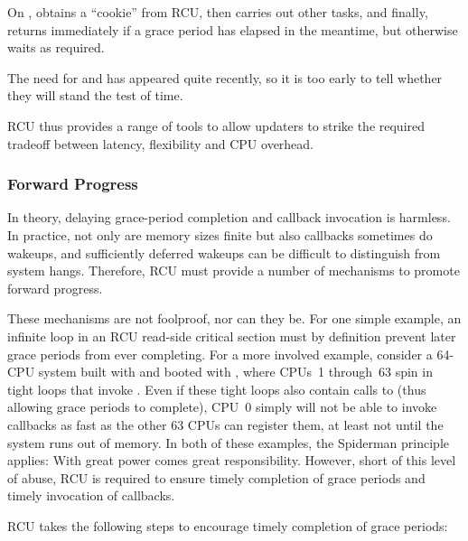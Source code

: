 \begin{fcvref}
On , %
 obtains a ``cookie'' from RCU,
then  %
carries out other tasks, and finally,  %
returns
immediately if a grace period has elapsed in the meantime, but otherwise
waits as required.
\end{fcvref}
The need for  and
 has appeared quite recently, so it is too
early to tell whether they will stand the test of time.

RCU thus provides a range of tools to allow updaters to strike the
required tradeoff between latency, flexibility and CPU overhead.


\subsubsection{Forward Progress}

In theory, delaying grace-period completion and callback invocation is
harmless.
In practice, not only are memory sizes finite but also
callbacks sometimes do wakeups, and sufficiently deferred wakeups can be
difficult to distinguish from system hangs.
Therefore, RCU must provide
a number of mechanisms to promote forward progress.

These mechanisms are not foolproof, nor can they be. For one simple
example, an infinite loop in an RCU read-side critical section must by
definition prevent later grace periods from ever completing.
For a more
involved example, consider a 64-CPU system built with
 and booted with , where
CPUs~1 through~63 spin in tight loops that invoke .
Even
if these tight loops also contain calls to  (thus
allowing grace periods to complete), CPU~0 simply will not be able to
invoke callbacks as fast as the other 63 CPUs can register them, at
least not until the system runs out of memory.
In both of these
examples, the Spiderman principle applies:
With great power comes great
responsibility.
However, short of this level of abuse, RCU is required
to ensure timely completion of grace periods and timely invocation of
callbacks.

RCU takes the following steps to encourage timely completion of grace
periods:

